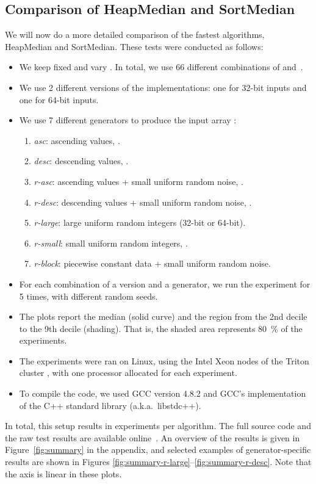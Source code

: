 \documentclass[a4paper,11pt]{article}
\begin{document}
\subsection{Comparison of HeapMedian and SortMedian}

We will now do a more detailed comparison of the fastest algorithms, HeapMedian and SortMedian. These tests were conducted as follows:
\begin{itemize}
    \item We keep  fixed and vary . In total, we use 66 different combinations of  and~.
    \item We use 2 different versions of the implementations: one for 32-bit inputs and one for 64-bit inputs.
    \item We use 7 different generators to produce the input array :
    \begin{enumerate}[noitemsep]
        \item \emph{asc}: ascending values, .
        \item \emph{desc}: descending values, .
        \item \emph{r-asc}: ascending values + small uniform random noise, .
        \item \emph{r-desc}: descending values + small uniform random noise, .
        \item \emph{r-large}: large uniform random integers (32-bit or 64-bit).
        \item \emph{r-small}: small uniform random integers, .
        \item \emph{r-block}: piecewise constant data + small uniform random noise.
    \end{enumerate}
    \item For each combination of a version and a generator, we run the experiment for 5 times, with different random seeds.
    \item The plots report the median (solid curve) and the region from the 2nd decile to the 9th decile (shading). That is, the shaded area represents 80~\% of the experiments.
    \item The experiments were ran on Linux, using the Intel Xeon nodes of the Triton cluster , with one processor allocated for each experiment.
    \item To compile the code, we used GCC version 4.8.2 and GCC's implementation of the C++ standard library (a.k.a.\ libstdc++).
\end{itemize}
In total, this setup results in  experiments per algorithm. The full source code and the raw test results are available online~. An overview of the results is given in Figure~\ref{fig:summary} in the appendix, and selected examples of generator-specific results are shown in Figures \ref{fig:summary-r-large}--\ref{fig:summary-r-desc}. Note that the  axis is linear in these plots.
\end{document}
